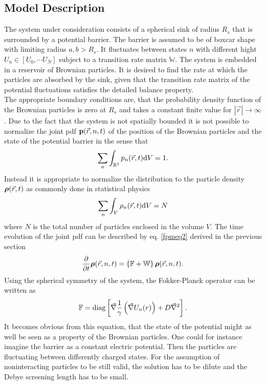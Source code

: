 \subsection{Model Description}
The system under consideration consists of a spherical sink of radius $R_s$ that is surrounded by a potential barrier. The barrier is assumed to be of boxcar shape with limiting radius $a,b>R_s$. It fluctuates between states $n$ with different hight $U_n \in [U_0, \cdots U_N]$ subject to a transition rate matrix $\mathbb{W}$. The system is embedded in a reservoir of Brownian particles. It is desired to find the rate at which the particles are absorbed by the sink, given that the transition rate matrix of the potential fluctuations satisfies the detailed balance property.\\
The appropriate boundary conditions are, that the probability density function of the Brownian particles is zero at $R_s$ and takes a constant finite value for $|\vec{r}| \rightarrow \infty$. Due to the fact that the system is not spatially bounded it is not possible to normalize the joint pdf $\boldsymbol{\mathbf{p}}(\vec{r},n,t)$ of the position of the Brownian particles and the state of the potential barrier in the sense that 
\begin{equation}
    \sum_n \int_{\mathbb{R}^{3}} p_n(\vec{r},t) {\rm d}V = 1.
    \label{pdfNormalization}
\end{equation}
Instead it is appropriate to normalize the distribution to the particle density $\boldsymbol{\mathbf{\rho}}(\vec{r},t)$ as commonly done in statistical physics
\begin{equation}
    \sum_n \int_V \rho_n(\vec{r},t) {\rm d}V = N
    \label{densNormalisation}
\end{equation}
where $N$ is the total number of particles enclosed in the volume $V$. The time evolution of the joint pdf can be described by eq. \eqref{fpmeq2} derived in the previous section
\begin{equation}
    \frac{\partial}{\partial t}\boldsymbol{\mathbf{\rho}}(\vec{r},n,t) = \left\{ \mathbb{F} + \mathbb{W} \right\} \boldsymbol{\mathbf{\rho}}(\vec{r},n,t).
    \label{fpmeq3}
\end{equation}
Using the spherical symmetry of the system, the Fokker-Planck operator can be written as
\begin{equation}
    \mathbb{F} = {\rm diag}\left[ \vec{\nabla}\frac{1}{\gamma}\left( \vec{\nabla} U_n(r) \right)+ D \vec{\nabla}^{2} \right].
    \label{fpo2}
\end{equation}
It becomes obvious from this equation, that the state of the potential might as well be seen as a property of the Brownian particles. One could for instance imagine the barrier as a constant electric potential. Then the particles are fluctuating between differently charged states. For the assumption of noninteracting particles to be still valid, the solution has to be dilute and the Debye screening length has to be small. \\
